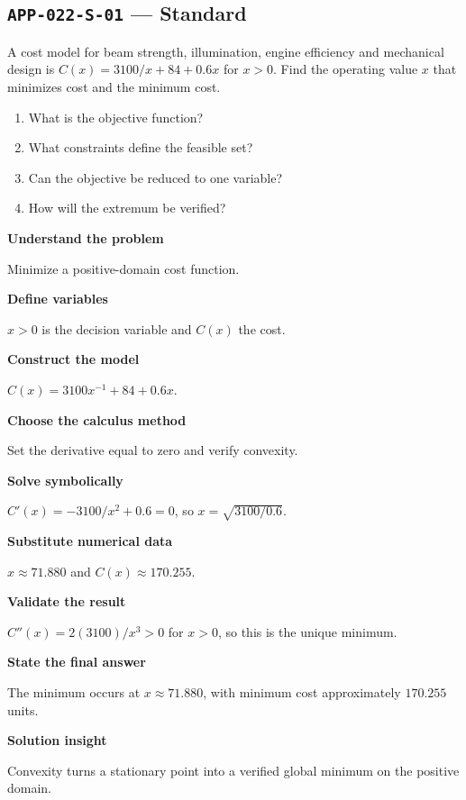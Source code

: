 \documentclass[11pt]{book}
\newcommand{\pid}[1]{\texttt{#1}}
\begin{document}
\subsection*{\pid{APP-022-S-01} — Standard}
\begin{problembox}
A cost model for beam strength, illumination, engine efficiency and mechanical design is $C(x)=3100/x+84+0.6x$ for $x>0$. Find the operating value $x$ that minimizes cost and the minimum cost.
\end{problembox}
\begin{promptbox}\begin{enumerate}
\item What is the objective function?
\item What constraints define the feasible set?
\item Can the objective be reduced to one variable?
\item How will the extremum be verified?
\end{enumerate}\end{promptbox}
\begin{solutionbox}
\textbf{Understand the problem}\par Minimize a positive-domain cost function.\par\medskip
\textbf{Define variables}\par $x>0$ is the decision variable and $C(x)$ the cost.\par\medskip
\textbf{Construct the model}\par $C(x)=3100x^{-1}+84+0.6x$.\par\medskip
\textbf{Choose the calculus method}\par Set the derivative equal to zero and verify convexity.\par\medskip
\textbf{Solve symbolically}\par $C'(x)=-3100/x^2+0.6=0$, so $x=\sqrt{3100/0.6}$.\par\medskip
\textbf{Substitute numerical data}\par $x\approx 71.880$ and $C(x)\approx 170.255$.\par\medskip
\textbf{Validate the result}\par $C''(x)=2(3100)/x^3>0$ for $x>0$, so this is the unique minimum.\par\medskip
\textbf{State the final answer}\par The minimum occurs at $x\approx 71.880$, with minimum cost approximately $170.255$ units.\par\medskip
\textbf{Solution insight}\par Convexity turns a stationary point into a verified global minimum on the positive domain.\par\medskip
\end{solutionbox}
\end{document}
